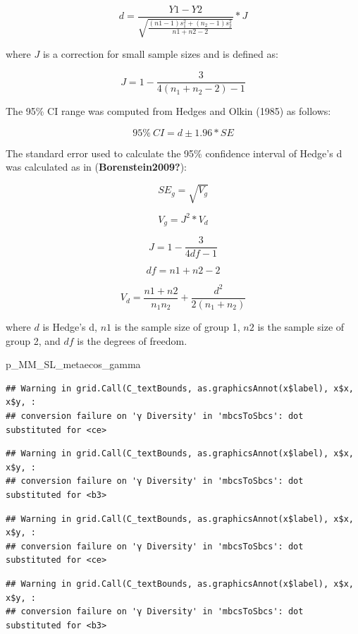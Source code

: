 \documentclass[
]{article}
\newenvironment{Shaded}{\begin{snugshade}}{\end{snugshade}}
\newcommand{\NormalTok}[1]{#1}
\begin{document}
\[d = \frac{Y1 - Y2}{\sqrt{\frac{  ( n1 - 1 ) s_1^2  + ( n_2 - 1 ) s_2^2 }{n1 + n2 - 2}}} * J\]

where \(J\) is a correction for small sample sizes and is defined as:

\[J = 1 - \frac{3}{4 ( n_1 + n_2 - 2) - 1} \]

The 95\% CI range was computed from Hedges and Olkin (1985) as follows:

\[
95\% \: CI = d ± 1.96 * SE
\]

The standard error used to calculate the 95\% confidence interval of
Hedge's d was calculated as in (\textbf{Borenstein2009?}):

\[
SE_g = \sqrt{V_g}
\]

\[
V_g = J^2 * V_d
\]

\[
J = 1 - \frac{3}{4df-1}
\]

\[
df = n1 + n2 - 2
\]

\[
V_d = \frac{n1 + n2}{n_1 n_2} + \frac{d^2}{2(n_1 + n_2)}
\]

where \(d\) is Hedge's d, \(n1\) is the sample size of group 1, \(n2\)
is the sample size of group 2, and \(df\) is the degrees of freedom.

\begin{Shaded}
\begin{Highlighting}[]
\NormalTok{p\_MM\_SL\_metaecos\_gamma}
\end{Highlighting}
\end{Shaded}

\begin{verbatim}
## Warning in grid.Call(C_textBounds, as.graphicsAnnot(x$label), x$x, x$y, :
## conversion failure on 'γ Diversity' in 'mbcsToSbcs': dot substituted for <ce>
\end{verbatim}

\begin{verbatim}
## Warning in grid.Call(C_textBounds, as.graphicsAnnot(x$label), x$x, x$y, :
## conversion failure on 'γ Diversity' in 'mbcsToSbcs': dot substituted for <b3>
\end{verbatim}

\begin{verbatim}
## Warning in grid.Call(C_textBounds, as.graphicsAnnot(x$label), x$x, x$y, :
## conversion failure on 'γ Diversity' in 'mbcsToSbcs': dot substituted for <ce>
\end{verbatim}

\begin{verbatim}
## Warning in grid.Call(C_textBounds, as.graphicsAnnot(x$label), x$x, x$y, :
## conversion failure on 'γ Diversity' in 'mbcsToSbcs': dot substituted for <b3>
\end{verbatim}
\end{document}
